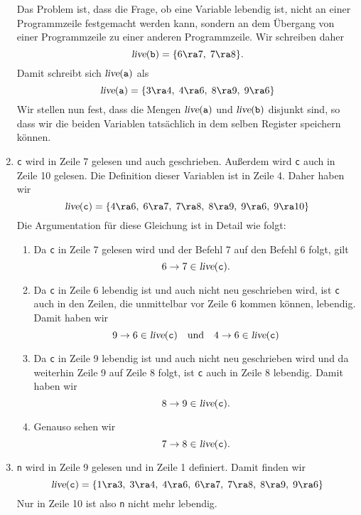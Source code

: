 \begin{enumerate}
      Das Problem ist, dass die Frage, ob eine Variable lebendig ist, nicht an einer
      Programmzeile festgemacht werden kann, sondern an dem \"Ubergang von einer
      Programmzeile zu einer anderen Programmzeile.  Wir schreiben daher
      \[ \textsl{live}(\mathtt{b}) = \{ 6 \ra 7,\; 7 \ra 8 \}. \]
      Damit schreibt sich $\textsl{live}(\mathtt{a})$ als
      \[ \textsl{live}(\mathtt{a}) = \{ 3 \ra 4,\; 4 \ra 6,\; 8 \ra 9,\; 9 \ra 6 \} \]
      Wir stellen nun fest, dass die Mengen $\textsl{live}(\mathtt{a})$ und
      $\textsl{live}(\mathtt{b})$ disjunkt sind, so dass wir die beiden Variablen
      tats\"achlich in dem selben Register speichern k\"onnen.
\item \texttt{c} wird in Zeile 7 gelesen und auch geschrieben.  Au{\ss}erdem wird \texttt{c}
      auch in Zeile 10 gelesen.  Die Definition dieser Variablen ist in Zeile 4.  Daher
      haben wir
      \[ \textsl{live}(\mathtt{c})  = 
         \{ 4 \ra 6,\; 6 \ra 7,\; 7 \ra 8,\; 8 \ra 9,\; 9 \ra 6,\; 9 \ra 10 \}
      \]
      Die Argumentation f\"ur diese Gleichung ist in Detail wie folgt:
      \begin{enumerate}
      \item Da \texttt{c} in Zeile 7 gelesen wird und der Befehl 7 auf den Befehl 6 folgt, gilt
            \[ 6 \rightarrow 7 \in \textsl{live}(\mathtt{c}). \]
      \item Da \texttt{c} in Zeile 6 lebendig ist und auch nicht neu geschrieben wird,
            ist \texttt{c} auch in den Zeilen, die unmittelbar vor Zeile 6 kommen k\"onnen, lebendig.
            Damit haben wir
            \[ 9 \rightarrow 6 \in \textsl{live}(\mathtt{c}) \quad \mbox{und} \quad
               4 \rightarrow 6 \in \textsl{live}(\mathtt{c}) 
            \]
      \item Da \texttt{c} in Zeile 9 lebendig ist und auch nicht neu geschrieben wird
            und da weiterhin Zeile 9 auf Zeile 8 folgt, ist \texttt{c} auch in Zeile 8 lebendig.
            Damit haben wir
            \[ 8 \rightarrow 9 \in \textsl{live}(\mathtt{c}). \]
      \item Genauso sehen wir       
            \[ 7 \rightarrow 8 \in \textsl{live}(\mathtt{c}). \]
      \end{enumerate}
\item \texttt{n} wird in Zeile 9 gelesen und in Zeile 1 definiert.  Damit finden wir
      \[ \textsl{live}(\mathtt{c})  = 
         \{ 1 \ra 3,\; 3 \ra 4,\; 4 \ra 6,\; 6 \ra 7,\; 7 \ra 8,\; 8 \ra 9,\; 9 \ra 6 \}
      \]
      Nur in Zeile 10 ist also \texttt{n} nicht mehr lebendig.
\end{enumerate}

